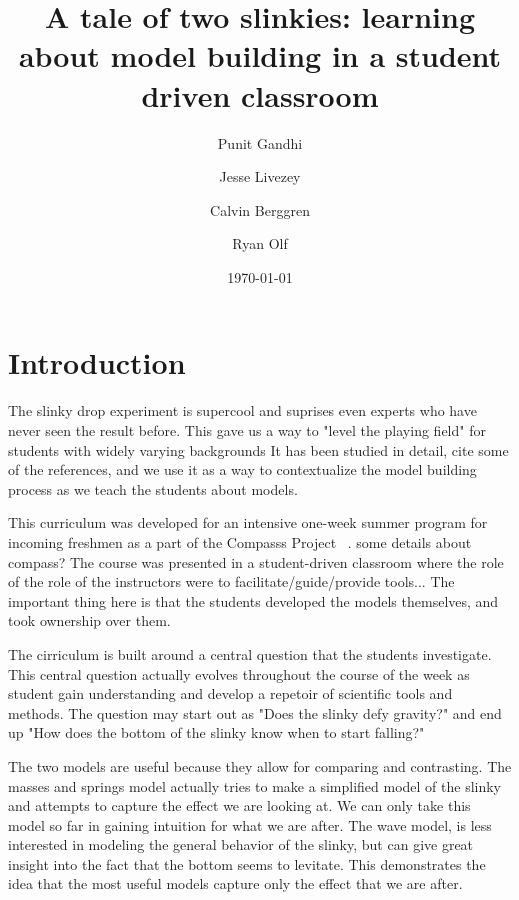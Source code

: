 \documentclass[aps,pre,10pt,superscriptaddress,showpacs,amsmath,amssymb,nofootinbib]{revtex4-1}
\begin{document}
\title{A tale of two slinkies: learning about model building in a student driven classroom }
\author{Punit  Gandhi}
\author{Jesse Livezey}
\author{Calvin Berggren}
\author{Ryan Olf}
\date{\today}

\begin{abstract}

\end{abstract}

\maketitle

\section{Introduction}
The slinky drop experiment is supercool and suprises even experts who have never
seen the result before.  This gave us a way to "level the playing field" for
students with widely varying backgrounds    It has been studied in detail, cite
some of the references, and we use it as a way to contextualize the model
building process as we teach the students about models.

This curriculum was developed for an intensive one-week summer program for
incoming freshmen as a part of the Compasss Project ~\cite{albana2013}. some
details about compass?  The course was presented in a student-driven classroom
where the role of the role of the instructors were to facilitate/guide/provide
tools...  The important thing here is that the students developed the models
themselves, and took ownership over them.

The cirriculum is built around a central question that the students investigate.
 This central question actually evolves throughout the course of the week as
student gain understanding and develop a repetoir of scientific tools and
methods.  The question may start out as "Does the slinky defy gravity?" and end
up  "How does the bottom of the slinky know when to start falling?"

The two models are useful because they allow for comparing and contrasting. The
masses and springs model actually tries to make a simplified model of the slinky
and attempts to capture the effect we are looking at.  We can only take this
model so far in gaining intuition for what we are after.    The wave model, is
less interested in modeling the general behavior of the slinky, but can give
great insight into the fact that the bottom seems to levitate.  This
demonstrates the idea that the most useful  models  capture only the effect that
we are after.
\end{document}
